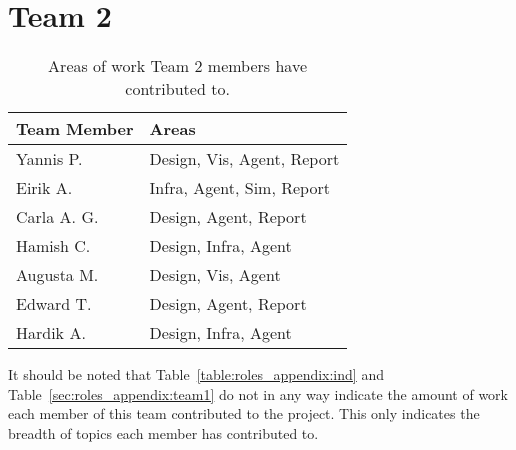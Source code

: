 \section{Team 2}
\label{sec:roles_appendix:team2}

\begin{table}[H]
    \centering
    \begin{tabular}{|l|l|}
    \hline
    \textbf{Team Member} & \textbf{Areas}        \\ \hline
    Yannis P.     & Design, Vis, Agent, Report   \\
    Eirik A.      & Infra, Agent, Sim, Report    \\
    Carla A. G.   & Design, Agent, Report        \\
    Hamish C.     & Design, Infra, Agent         \\
    Augusta M.    & Design, Vis, Agent           \\
    Edward T.     & Design, Agent, Report        \\
    Hardik A.     & Design, Infra, Agent         \\ \hline
\end{tabular}
\caption{Areas of work Team 2 members have contributed to.}
\label{sec:roles_appendix:team2}
\end{table}

It should be noted that Table~\ref{table:roles_appendix:ind} and Table~\ref{sec:roles_appendix:team1} do not in any way indicate the amount of work each member of this team contributed to the project. This only indicates the breadth of topics each member has contributed to. 